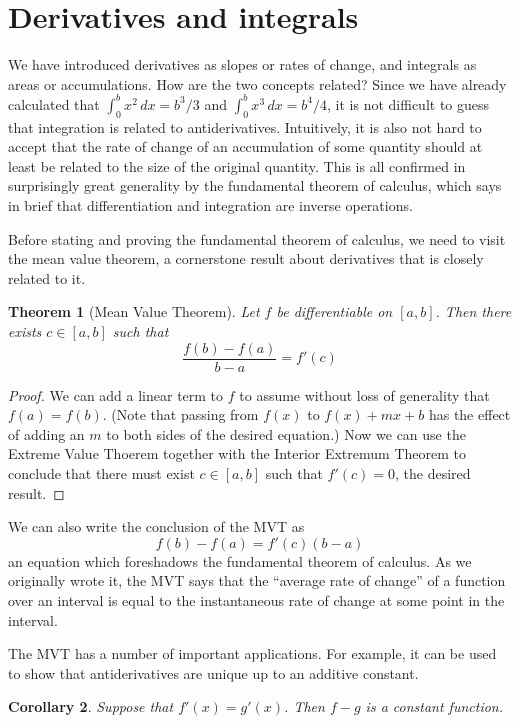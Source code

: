 \documentclass[11pt,oneside]{amsbook}
\theoremstyle{definition}
\theoremstyle{plain}
\newtheorem{theorem}{Theorem}[section]
\newtheorem{corollary}[theorem]{Corollary}
\theoremstyle{definition}
\theoremstyle{remark}
\numberwithin{equation}{section}
\numberwithin{figure}{section}
\begin{document}
\section{Derivatives and integrals}

We have introduced derivatives as slopes or rates of change, and integrals as areas or accumulations. How are the two concepts related? Since we have already calculated that $\int_0^b x^2\,dx=b^3/3$ and $\int_0^b x^3\,dx=b^4/4$, it is not difficult to guess that integration is related to antiderivatives. Intuitively, it is also not hard to accept that the rate of change of an accumulation of some quantity should at least be related to the size of the original quantity. This is all confirmed in surprisingly great generality by the fundamental theorem of calculus, which says in brief that differentiation and integration are inverse operations.

Before stating and proving the fundamental theorem of calculus, we need to visit the mean value theorem, a cornerstone result about derivatives that is closely related to it.

\begin{theorem}[Mean Value Theorem]
  Let $f$ be differentiable on $[a,b]$. Then there exists $c\in[a,b]$ such that
  \[\frac{f(b)-f(a)}{b-a}=f'(c)
  \]
\end{theorem}

\begin{proof}
  We can add a linear term to $f$ to assume without loss of generality that $f(a)=f(b)$. (Note that passing from $f(x)$ to $f(x)+mx+b$ has the effect of adding an $m$ to both sides of the desired equation.) Now we can use the Extreme Value Thoerem together with the Interior Extremum Theorem to conclude that there must exist $c\in[a,b]$ such that $f'(c)=0$, the desired result.
\end{proof}

We can also write the conclusion of the MVT as
\[f(b)-f(a)=f'(c)(b-a)
\]
an equation which foreshadows the fundamental theorem of calculus. As we originally wrote it, the MVT says that the ``average rate of change'' of a function over an interval is equal to the instantaneous rate of change at some point in the interval.

The MVT has a number of important applications. For example, it can be used to show that antiderivatives are unique up to an additive constant.

\begin{corollary}
  Suppose that $f'(x)=g'(x)$. Then $f-g$ is a constant function.
\end{corollary}
\end{document}
